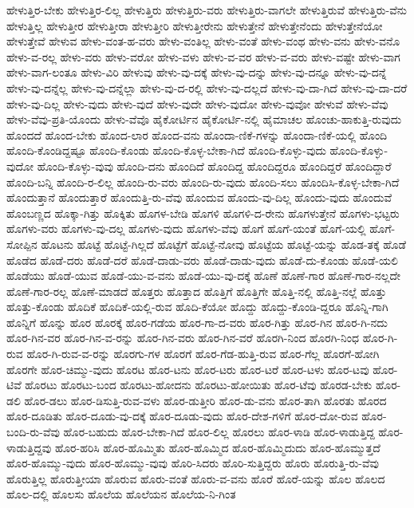 {ಹೇಳುತ್ತಿರ-ಬೇಕು
ಹೇಳುತ್ತಿರ-ಲಿಲ್ಲ
ಹೇಳುತ್ತಿರು
ಹೇಳುತ್ತಿರು-ವರು
ಹೇಳುತ್ತಿರು-ವಾಗಲೇ
ಹೇಳುತ್ತಿರುವೆ
ಹೇಳುತ್ತಿರು-ವೆನು
ಹೇಳುತ್ತಿಲ್ಲ
ಹೇಳುತ್ತೀರ
ಹೇಳುತ್ತೀರಾ
ಹೇಳುತ್ತೀರಿ
ಹೇಳುತ್ತೀರೇನು
ಹೇಳುತ್ತೇನೆ
ಹೇಳುತ್ತೇನೆಂದು
ಹೇಳುತ್ತೇನೆಯೋ
ಹೇಳುತ್ತೇವೆ
ಹೇಳುವ
ಹೇಳು-ವಂತ-ಹ-ವರು
ಹೇಳು-ವಂತಿಲ್ಲ
ಹೇಳು-ವಂತೆ
ಹೇಳು-ವಂಥ
ಹೇಳು-ವನು
ಹೇಳು-ವನೊ
ಹೇಳು-ವ-ರಲ್ಲ
ಹೇಳು-ವರು
ಹೇಳು-ವರೋ
ಹೇಳು-ವಳು
ಹೇಳು-ವ-ವರ
ಹೇಳು-ವ-ವರು
ಹೇಳು-ವಷ್ಟೇ
ಹೇಳು-ವಾಗ
ಹೇಳು-ವಾಗ-ಲಂತೂ
ಹೇಳು-ವಿರಿ
ಹೇಳುವು
ಹೇಳು-ವು-ದಕ್ಕೆ
ಹೇಳು-ವು-ದನ್ನು
ಹೇಳು-ವು-ದನ್ನೂ
ಹೇಳು-ವು-ದನ್ನೆ
ಹೇಳು-ವು-ದನ್ನೆಲ್ಲ
ಹೇಳು-ವು-ದನ್ನೆಲ್ಲಾ
ಹೇಳು-ವು-ದ-ರಲ್ಲಿ
ಹೇಳು-ವು-ದಲ್ಲದೆ
ಹೇಳು-ವು-ದಾ-ಗಿದೆ
ಹೇಳು-ವು-ದಾ-ದರೆ
ಹೇಳು-ವು-ದಿಲ್ಲ
ಹೇಳು-ವುದು
ಹೇಳು-ವುದೆ
ಹೇಳು-ವುದೇ
ಹೇಳು-ವುದೋ
ಹೇಳು-ವುವೋ
ಹೇಳುವೆ
ಹೇಳು-ವೆವು
ಹೇಳು-ವೆವು-ಪ್ರತಿ-ಯೊಂದು
ಹೇಳು-ವೆವೊ
ಹೈಕೋರ್ಟಿನ
ಹೈಕೋರ್ಟಿ-ನಲ್ಲಿ
ಹೈಮಾಚಲ
ಹೊಂಚು-ಹಾಕುತ್ತಿ-ರುವುದು
ಹೊಂದದೆ
ಹೊಂದ-ಬೇಕು
ಹೊಂದ-ಲಾರ
ಹೊಂದ-ವನು
ಹೊಂದಾ-ಣಿಕೆ-ಗಳನ್ನು
ಹೊಂದಾ-ಣಿಕೆ-ಯಲ್ಲಿ
ಹೊಂದಿ
ಹೊಂದಿ-ಕೊಂಡಿದ್ದಷ್ಟೂ
ಹೊಂದಿ-ಕೊಂಡು
ಹೊಂದಿ-ಕೊಳ್ಳ-ಬೇಕಾ-ಗಿದೆ
ಹೊಂದಿ-ಕೊಳ್ಳು-ವುದು
ಹೊಂದಿ-ಕೊಳ್ಳು-ವುದೋ
ಹೊಂದಿ-ಕೊಳ್ಳು-ವುವು
ಹೊಂದಿ-ದನು
ಹೊಂದಿದೆ
ಹೊಂದಿದ್ದ
ಹೊಂದಿದ್ದರೂ
ಹೊಂದಿದ್ದರೆ
ಹೊಂದಿದ್ದಾರೆ
ಹೊಂದಿ-ಬನ್ನಿ
ಹೊಂದಿ-ರ-ಲಿಲ್ಲ
ಹೊಂದಿ-ರು-ವರು
ಹೊಂದಿ-ರು-ವುದು
ಹೊಂದಿ-ಸಲು
ಹೊಂದಿಸಿ-ಕೊಳ್ಳ-ಬೇಕಾ-ಗಿದೆ
ಹೊಂದುತ್ತಾನೆ
ಹೊಂದುತ್ತಾರೆ
ಹೊಂದುತ್ತಿ-ರು-ವೆವು
ಹೊಂದುವ
ಹೊಂದು-ವು-ದಿಲ್ಲ
ಹೊಂದು-ವುದು
ಹೊಂದುವೆ
ಹೊಂಬಣ್ಣದ
ಹೊಕ್ಕಾ-ಗಿತ್ತು
ಹೊಕ್ಕಿತು
ಹೊಗಳ-ಬೇಡಿ
ಹೊಗಳಿ
ಹೊಗಳಿ-ದ-ರೇನು
ಹೊಗಳುತ್ತೇನೆ
ಹೊಗಳು-ಭಟ್ಟರು
ಹೊಗಳು-ವರು
ಹೊಗಳು-ವು-ದಲ್ಲ
ಹೊಗಳು-ವುದು
ಹೊಗಳು-ವೆವು
ಹೊಗೆ
ಹೊಗೆ-ಯಂತೆ
ಹೊಗೆ-ಯಲ್ಲಿ
ಹೊಗೆ-ಸೋಪ್ಪಿನ
ಹೊಟನು
ಹೊಟ್ಟೆ
ಹೊಟ್ಟೆ-ಗಿಲ್ಲದೆ
ಹೊಟ್ಟೆಗೆ
ಹೊಟ್ಟೆ-ನೋವು
ಹೊಟ್ಟೆಯ
ಹೊಟ್ಟೆ-ಯನ್ನು
ಹೊಡ-ತಕ್ಕೆ
ಹೊಡೆ
ಹೊಡೆದ
ಹೊಡೆ-ದರು
ಹೊಡೆ-ದರೆ
ಹೊಡೆ-ದಾಡು-ವರು
ಹೊಡೆ-ದಾಡು-ವುದು
ಹೊಡೆ-ದು-ಕೊಂಡು
ಹೊಡೆ-ಯಲಿ
ಹೊಡೆಯು
ಹೊಡೆ-ಯುವ
ಹೊಡೆ-ಯು-ವ-ವನು
ಹೊಡೆ-ಯು-ವು-ದಕ್ಕೆ
ಹೊಣೆ
ಹೊಣೆ-ಗಾರ
ಹೊಣೆ-ಗಾರ-ನಲ್ಲದೇ
ಹೊಣೆ-ಗಾರ-ರಲ್ಲ
ಹೊಣೆ-ಮಾಡದೆ
ಹೊತ್ತರು
ಹೊತ್ತಾದ
ಹೊತ್ತಿಗೆ
ಹೊತ್ತಿಗೇ
ಹೊತ್ತಿ-ನಲ್ಲಿ
ಹೊತ್ತಿ-ನಲ್ಲೆ
ಹೊತ್ತು
ಹೊತ್ತು-ಕೊಂಡು
ಹೊದಿಕೆ
ಹೊದಿಕೆ-ಯಲ್ಲಿ-ರುವ
ಹೊದಿ-ಕೆಯೋ
ಹೊದ್ದು
ಹೊದ್ದು-ಕೊಂಡಿ-ದ್ದರೂ
ಹೊನ್ನಿ-ಗಾಗಿ
ಹೊನ್ನಿಗೆ
ಹೊನ್ನು
ಹೊರ
ಹೊರಕ್ಕೆ
ಹೊರ-ಗಡೆಯ
ಹೊರ-ಗಾ-ದ-ವರು
ಹೊರ-ಗಿತ್ತು
ಹೊರ-ಗಿನ
ಹೊರ-ಗಿ-ನದು
ಹೊರ-ಗಿನ-ವರ
ಹೊರ-ಗಿನ-ವ-ರನ್ನು
ಹೊರ-ಗಿನ-ವರು
ಹೊರ-ಗಿನ-ವರೆ
ಹೊರಗಿ-ನಿಂದ
ಹೊರಗಿ-ನಿಂಧ
ಹೊರ-ಗಿ-ರುವ
ಹೊರ-ಗಿ-ರುವ-ವ-ರನ್ನು
ಹೊರಗು-ಗಳ
ಹೊರಗೆ
ಹೊರ-ಗೆಡ-ಹುತ್ತಿ-ರುವ
ಹೊರ-ಗೆಲ್ಲ
ಹೊರಗೆ-ಹೋಗಿ
ಹೊರಗೇ
ಹೊರ-ಚಿಮ್ಮು-ವುದು
ಹೊರಟ
ಹೊರ-ಟನು
ಹೊರ-ಟರು
ಹೊರ-ಟರೆ
ಹೊರ-ಟಳು
ಹೊರ-ಟವು
ಹೊರ-ಟಿವೆ
ಹೊರಟು
ಹೊರಟು-ಬಂದ
ಹೊರಟು-ಹೋದನು
ಹೊರಟು-ಹೋಯಿತು
ಹೊರ-ಟೆವು
ಹೊರಡ-ಬೇಕು
ಹೊರ-ಡಲಿ
ಹೊರ-ಡಲು
ಹೊರ-ಡಿಸುತ್ತಿ-ರುವ-ವಳು
ಹೊರ-ಡುತ್ತೀರಿ
ಹೊರ-ಡು-ವನು
ಹೊರ-ತಾಗಿ
ಹೊರತು
ಹೊರದ
ಹೊರ-ದೂಡಿತು
ಹೊರ-ದೂಡು-ವು-ದಕ್ಕೆ
ಹೊರ-ದೂಡು-ವುದು
ಹೊರ-ದೇಶ-ಗಳಿಗೆ
ಹೊರ-ದೋ-ರುವ
ಹೊರ-ಬಂದಿ-ರು-ವೆವು
ಹೊರ-ಬಹುದು
ಹೊರ-ಬೇಕಾ-ಗಿದೆ
ಹೊರ-ಲಿಲ್ಲ
ಹೊರಲು
ಹೊರ-ಳಾಡಿ
ಹೊರ-ಳಾಡುತ್ತಿದ್ದ
ಹೊರ-ಳಾಡುತ್ತಿದ್ದವು
ಹೊರ-ಹರಿಸಿ
ಹೊರ-ಹೊಮ್ಮಿತು
ಹೊರ-ಹೊಮ್ಮಿದ
ಹೊರ-ಹೊಮ್ಮಿದುದು
ಹೊರ-ಹೊಮ್ಮುತ್ತದೆ
ಹೊರ-ಹೊಮ್ಮು-ವುದು
ಹೊರ-ಹೊಮ್ಮು-ವುವು
ಹೊರಿ-ಸಿದರು
ಹೊರಿ-ಸುತ್ತಿದ್ದರು
ಹೊರು
ಹೊರುತ್ತಿ-ರು-ವೆವು
ಹೊರುತ್ತಿಲ್ಲ
ಹೊರುತ್ತೀಯಾ
ಹೊರುವ
ಹೊರು-ವಂತೆ
ಹೊರು-ವ-ವನು
ಹೊರೆ
ಹೊರೆ-ಯನ್ನು
ಹೊಲ
ಹೊಲದ
ಹೊಲ-ದಲ್ಲಿ
ಹೊಲಸು
ಹೊಲೆಯ
ಹೊಲೆಯನ
ಹೊಲೆಯ-ನಿ-ಗಿಂತ
}
